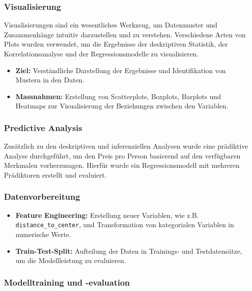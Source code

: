 \documentclass[
  journal,
]{IEEEtran}%
\begin{document}
\subsubsection{\texorpdfstring{\textbf{Visualisierung}}{Visualisierung}}\label{visualisierung}

Visualisierungen sind ein wesentliches Werkzeug, um Datenmuster und
Zusammenhänge intuitiv darzustellen und zu verstehen. Verschiedene Arten
von Plots wurden verwendet, um die Ergebnisse der deskriptiven
Statistik, der Korrelationsanalyse und der Regressionsmodelle zu
visualisieren.

\begin{itemize}
\item
  \textbf{Ziel:} Verständliche Darstellung der Ergebnisse und
  Identifikation von Mustern in den Daten.
\item
  \textbf{Massnahmen:} Erstellung von Scatterplots, Boxplots, Barplots
  und Heatmaps zur Visualisierung der Beziehungen zwischen den
  Variablen.
\end{itemize}

\subsubsection{Predictive Analysis}\label{predictive-analysis}

Zusätzlich zu den deskriptiven und inferenziellen Analysen wurde eine
prädiktive Analyse durchgeführt, um den Preis pro Person basierend auf
den verfügbaren Merkmalen vorherzusagen. Hierfür wurde ein
Regressionsmodell mit mehreren Prädiktoren erstellt und evaluiert.

\subsubsection{Datenvorbereitung}\label{datenvorbereitung}

\begin{itemize}
\item
  \textbf{Feature Engineering:} Erstellung neuer Variablen, wie z.B.
  \texttt{distance\_to\_center}, und Transformation von kategorialen
  Variablen in numerische Werte.
\item
  \textbf{Train-Test-Split:} Aufteilung der Daten in Trainings- und
  Testdatensätze, um die Modellleistung zu evaluieren.
\end{itemize}

\subsubsection{Modelltraining und
-evaluation}\label{modelltraining-und--evaluation}
\end{document}

